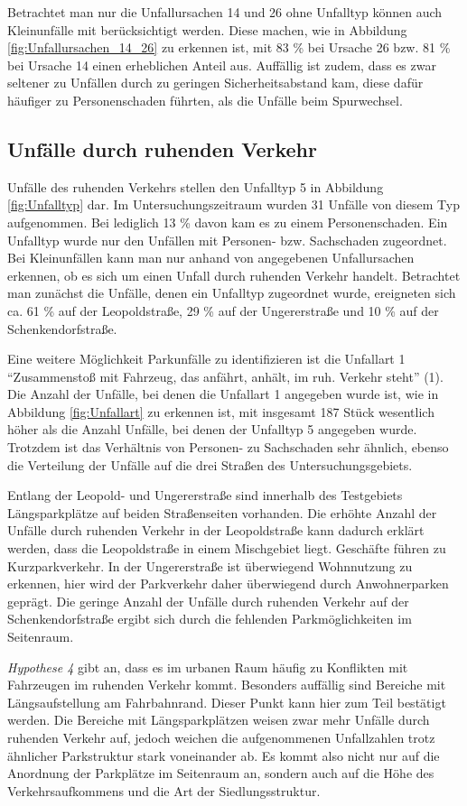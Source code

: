 Betrachtet man nur die Unfallursachen 14 und 26 ohne Unfalltyp können auch Kleinunfälle mit berücksichtigt werden. Diese machen, wie in Abbildung \ref{fig:Unfallursachen_14_26} zu erkennen ist, mit 83 \% bei Ursache 26 bzw. 81 \% bei Ursache 14 einen erheblichen Anteil aus. Auffällig ist zudem, dass es zwar seltener zu Unfällen durch zu geringen Sicherheitsabstand kam, diese dafür häufiger zu Personenschaden führten, als die Unfälle beim Spurwechsel.

\subsection{Unfälle durch ruhenden Verkehr}
Unfälle des ruhenden Verkehrs stellen den Unfalltyp 5 in Abbildung \ref{fig:Unfalltyp} dar. Im Untersuchungszeitraum wurden 31 Unfälle von diesem Typ aufgenommen. Bei lediglich 13 \% davon kam es zu einem Personenschaden. Ein Unfalltyp wurde nur den Unfällen mit Personen- bzw. Sachschaden zugeordnet. Bei Kleinunfällen kann man nur anhand von angegebenen Unfallursachen erkennen, ob es sich um einen Unfall durch ruhenden Verkehr handelt. Betrachtet man zunächst die Unfälle, denen ein Unfalltyp zugeordnet wurde, ereigneten sich ca. 61 \% auf der Leopoldstraße, 29 \% auf der Ungererstraße und 10 \% auf der Schenkendorfstraße. 

Eine weitere Möglichkeit Parkunfälle zu identifizieren ist die Unfallart 1 \enquote{Zusammenstoß mit Fahrzeug, das anfährt, anhält, im ruh. Verkehr steht} (1). Die Anzahl der Unfälle, bei denen die Unfallart 1 angegeben wurde ist, wie in Abbildung \ref{fig:Unfallart} zu erkennen ist, mit insgesamt 187 Stück wesentlich höher als die Anzahl Unfälle, bei denen der Unfalltyp 5 angegeben wurde. Trotzdem ist das Verhältnis von Personen- zu Sachschaden sehr ähnlich, ebenso die Verteilung der Unfälle auf die drei Straßen des Untersuchungsgebiets. 

Entlang der Leopold- und Ungererstraße sind innerhalb des Testgebiets Längsparkplätze auf beiden Straßenseiten vorhanden. Die erhöhte Anzahl der Unfälle durch ruhenden Verkehr in der Leopoldstraße kann dadurch erklärt werden, dass die Leopoldstraße in einem Mischgebiet liegt. Geschäfte führen zu Kurzparkverkehr. In der Ungererstraße ist überwiegend Wohnnutzung zu erkennen, hier wird der Parkverkehr daher überwiegend durch Anwohnerparken geprägt. Die geringe Anzahl der Unfälle durch ruhenden Verkehr auf der Schenkendorfstraße ergibt sich durch die fehlenden Parkmöglichkeiten im Seitenraum.

\textit{Hypothese 4} gibt an, dass es im urbanen Raum häufig zu Konflikten mit Fahrzeugen im ruhenden Verkehr kommt. Besonders auffällig sind Bereiche mit Längsaufstellung am Fahrbahnrand. Dieser Punkt kann hier zum Teil bestätigt werden. Die Bereiche mit Längsparkplätzen weisen zwar mehr Unfälle durch ruhenden Verkehr auf, jedoch weichen die aufgenommenen Unfallzahlen trotz ähnlicher Parkstruktur stark voneinander ab. Es kommt also nicht nur auf die Anordnung der Parkplätze im Seitenraum an, sondern auch auf die Höhe des Verkehrsaufkommens und die Art der Siedlungsstruktur.

